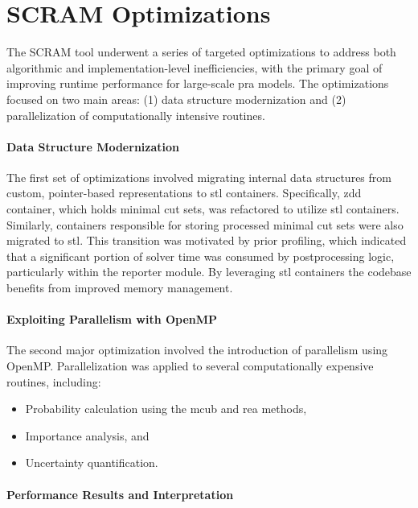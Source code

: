 \section{SCRAM Optimizations}

The SCRAM tool underwent a series of targeted optimizations to address both algorithmic and implementation-level inefficiencies, with the primary goal of improving runtime performance for large-scale \acrshort{pra} models. The optimizations focused on two main areas: (1) data structure modernization and (2) parallelization of computationally intensive routines.

\paragraph{Data Structure Modernization}

The first set of optimizations involved migrating internal data structures from custom, pointer-based representations to \acrfull{stl} containers. Specifically, \acrshort{zdd} container, which holds minimal cut sets, was refactored to utilize \acrshort{stl} containers. Similarly, containers responsible for storing processed minimal cut sets were also migrated to \acrshort{stl}. This transition was motivated by prior profiling, which indicated that a significant portion of solver time was consumed by postprocessing logic, particularly within the reporter module. By leveraging \acrshort{stl} containers the codebase benefits from improved memory management.
 
\paragraph{Exploiting Parallelism with OpenMP}

The second major optimization involved the introduction of parallelism using OpenMP. Parallelization was applied to several computationally expensive routines, including:

\begin{itemize}
    \item Probability calculation using the \acrshort{mcub} and \acrshort{rea} methods,
    \item Importance analysis, and
    \item Uncertainty quantification.
\end{itemize}

\paragraph{Performance Results and Interpretation}

